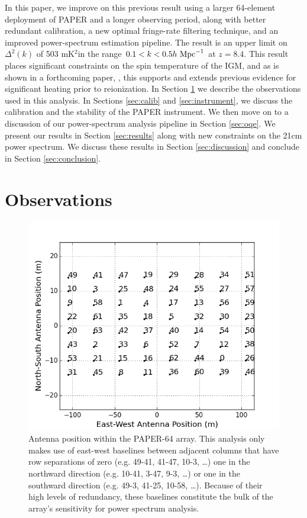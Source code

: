 \documentclass[twocolumn,numberedappendix]{emulateapj} \shorttitle{New Limits on the 21 cm Power Spectrum at $z=8.4$}
\newcommand{\hMpci}{h\ {\rm Mpc}^{-1}}
\newcommand{\mKsqlimit}{503 mK$^2$}
\begin{document}
In this paper, we improve on this previous result using
a larger 64-element deployment of PAPER and a longer observing period, along with better redundant calibration, a new
optimal fringe-rate filtering technique, and an improved power-spectrum estimation pipeline.
The result is an
upper limit on $\Delta^2(k)$ of \mKsqlimit in the range
$0.1<k<0.5\hMpci$ at $z=8.4$.  This result places significant constraints on the 
spin temperature of the IGM, and as is shown in a forthcoming paper,
\citet{pober_et_al2015}, this supports and extends
previous evidence for significant heating prior to
reionization.
In Section
\ref{sec:observations} we describe the observations used in this analysis. In
Sections \ref{sec:calib} and \ref{sec:instrument}, 
we discuss the calibration and 
the stability of the PAPER instrument.
We then move on to a discussion of our power-spectrum analysis pipeline in Section
\ref{sec:oqe}. 
We present our results in Section
\ref{sec:results} along with new constraints on the 21cm power spectrum.
We discuss these results in Section \ref{sec:discussion} and conclude in Section \ref{sec:conclusion}.



\section{Observations}\label{sec:observations}

\begin{figure}\centering
\includegraphics[width=\columnwidth]{plots/antenna_positions.png}
\caption{
Antenna position within the PAPER-64 array.
This analysis only makes use of
east-west baselines between adjacent columns that have row
separations of zero (e.g. 49-41, 41-47, 10-3, \dots)
one in the northward direction (e.g. 10-41, 3-47, 9-3, \dots) or
one in the southward direction (e.g. 49-3, 41-25, 10-58, \dots).
Because of their high levels of redundancy, 
these baselines constitute the bulk of the array's sensitivity for power
spectrum analysis.}
\label{fig:antenna_positions}
\end{figure}
\end{document}
